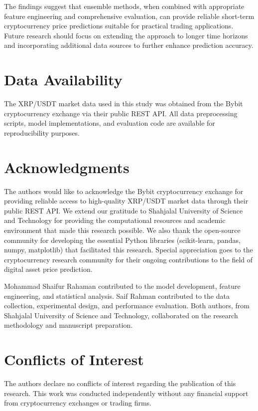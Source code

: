 \documentclass[11pt,a4paper]{article}
\begin{document}
The findings suggest that ensemble methods, when combined with appropriate feature engineering and comprehensive evaluation, can provide reliable short-term cryptocurrency price predictions suitable for practical trading applications. Future research should focus on extending the approach to longer time horizons and incorporating additional data sources to further enhance prediction accuracy.

\section{Data Availability}

The XRP/USDT market data used in this study was obtained from the Bybit cryptocurrency exchange via their public REST API. All data preprocessing scripts, model implementations, and evaluation code are available for reproducibility purposes.

\section{Acknowledgments}

The authors would like to acknowledge the Bybit cryptocurrency exchange for providing reliable access to high-quality XRP/USDT market data through their public REST API. We extend our gratitude to Shahjalal University of Science and Technology for providing the computational resources and academic environment that made this research possible. We also thank the open-source community for developing the essential Python libraries (scikit-learn, pandas, numpy, matplotlib) that facilitated this research. Special appreciation goes to the cryptocurrency research community for their ongoing contributions to the field of digital asset price prediction.

Mohammad Shaifur Rahaman contributed to the model development, feature engineering, and statistical analysis. Saif Rahman contributed to the data collection, experimental design, and performance evaluation. Both authors, from Shahjalal University of Science and Technology, collaborated on the research methodology and manuscript preparation.

\section{Conflicts of Interest}

The authors declare no conflicts of interest regarding the publication of this research. This work was conducted independently without any financial support from cryptocurrency exchanges or trading firms.
\end{document}
